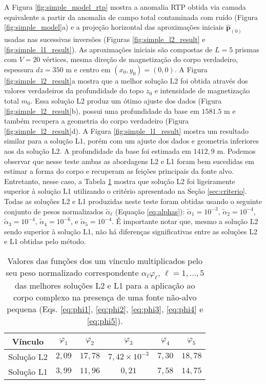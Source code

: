 A Figura \ref{fig:simple_model_rtp} mostra a anomalia RTP obtida via camada equivalente a partir da anomalia de campo total contaminada com ruído (Figura \ref{fig:simple_model}a) e 
a projeção horizontal das aproximações iniciais $\hat{\mathbf{p}}_{(0)}$ 
usadas nas sucessivas inversões (Figuras \ref{fig:simple_l2_result} e 
\ref{fig:simple_l1_result}).
As aproximações iniciais são compostas de $ L= 5$ prismas com $ V = 20 $ vértices, mesma direção de magnetização do corpo verdadeiro, espessura $ dz=350 $ m e centro em $ (x_0, y_0) = (0, 0) $.
A Figura \ref{fig:simple_l2_result}a mostra que a melhor solução L2 foi obtida através dos valores verdadeiros da profundidade do topo $z_{0}$ e intensidade de magnetização total $m_{0}$.
Essa solução L2 produz um ótimo ajuste dos dados (Figura \ref{fig:simple_l2_result}b), possui uma profundidade da base em $1581.5$ m e também recupera a geometria do corpo verdadeiro (Figura \ref{fig:simple_l2_result}d).
A Figura \ref{fig:simple_l1_result} mostra um resultado similar para a solução L1, porém com um ajuste dos dados e geometria inferiores aos da solução L2. A profundidade da base foi estimada em $1412,9$ m.
Podemos observar que nesse teste ambas as abordagens L2 e L1 foram bem sucedidas em estimar a forma do corpo e recuperam as feições principais da fonte alvo.
Entretanto, nesse caso, a Tabela \ref{tab:simple} mostra que solução L2 foi ligeiramente superior à solução L1 utilizando o critério apresentado na Seção \ref{sec:criterio}.
Todas as soluções L2 e L1 produzidas neste teste foram obtidas usando o seguinte conjunto de pesos normalizados $\tilde{\alpha}_{\ell}$ (Equação \ref{eq:alphas}): 
$\tilde{\alpha}_{1} = 10^{-3}$, $\tilde{\alpha}_{2} = 10^{-4}$, 
$\tilde{\alpha}_{3} = 10^{-4}$, $\tilde{\alpha}_{4} = 10^{-6}$, e 
$\tilde{\alpha}_{5} = 10^{-4}$. 
É importante notar que, mesmo a solução L2 sendo superior à solução L1, não há diferenças significativas entre as soluções L2 e L1 obtidas pelo método.

\begin{table}[h]\label{tab:simple}
	\caption{Valores das funções dos um vínculo multiplicados pelo seu peso normalizado correspondente $ \alpha_\ell \varphi_\ell  $, $ \ell=1,\dots,5 $ das melhores soluções L2 e L1 para a aplicação ao corpo complexo na presença de uma fonte não-alvo pequena (Eqs. \ref{eq:phi1}, \ref{eq:phi2}, \ref{eq:phi3}, \ref{eq:phi4} e \ref{eq:phi5}).}
	\centering
	\vspace{0.5cm}
	\begin{tabular}{c|ccccc}
		Vínculo & $ \varphi _1 $ & $ \varphi _2 $ &  $ \varphi _3 $ &  $ \varphi _4 $ &  $ \varphi _5 $ \\
		\hline
		Solução L2 & $ 2,09 $ & $ 17,78 $ & $ 7,42\times 10^{-3} $ & $7,30 $ & $ 18,78 $ \\ 
		Solução L1 & $ 3,99 $ & $ 11,96 $ & $ 0,21 $ & $7,58$ & $ 14,75 $
	\end{tabular}
\end{table}

